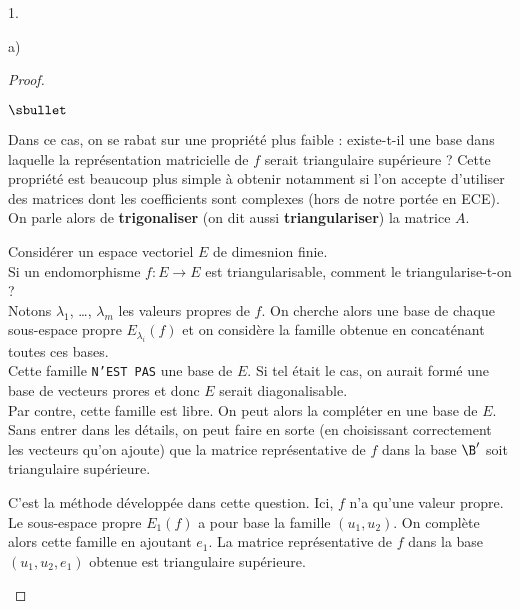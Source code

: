 \documentclass[11pt]{article}%
\begin{document}
\begin{noliste}{1.}
\begin{noliste}{a)}
\begin{proof}
\begin{remarkL}{.98}
\begin{noliste}{$\sbullet$}
      \item Dans ce cas, on se rabat sur une propriété plus faible :
        existe-t-il une base dans laquelle la représentation
        matricielle de $f$ serait triangulaire supérieure ? Cette
        propriété est beaucoup plus simple à obtenir notamment si l'on
        accepte d'utiliser des matrices dont les coefficients sont
        complexes (hors de notre portée en ECE).\\
        On parle alors de {\bf trigonaliser} (on dit aussi {\bf
          triangulariser}) la matrice $A$.

      \item Considérer un espace vectoriel $E$ de dimesnion finie. \\
        Si un endomorphisme $f : E \to E$ est triangularisable,
        comment le triangularise-t-on ? \\
        Notons $\lambda_1$, \ldots, $\lambda_m$ les valeurs propres de
        $f$. On cherche alors une base de chaque sous-espace propre
        $E_{\lambda_i}(f)$ et on considère la famille obtenue en
        concaténant toutes ces bases.\\
        Cette famille {\tt N'EST PAS} une base de $E$. Si tel était le
        cas, on aurait formé une base de vecteurs prores et donc $E$
        serait diagonalisable. \\
        Par contre, cette famille est libre. On peut alors la
        compléter en une base de $E$.\\
        Sans entrer dans les détails, on peut faire en sorte (en
        choisissant correctement les vecteurs qu'on ajoute) que la
        matrice représentative de $f$ dans la base $\B'$ soit
        triangulaire supérieure.

      \item C'est la méthode développée dans cette question. Ici, $f$
        n'a qu'une valeur propre. Le sous-espace propre $E_1(f)$ a
        pour base la famille $( u_1, u_2 )$. On complète alors cette
        famille en ajoutant $e_1$. La matrice représentative de $f$
        dans la base $( u_1, u_2, e_1 )$ obtenue est triangulaire
        supérieure.


\end{noliste}
\end{remarkL}
\end{proof}
\end{noliste}
\end{noliste}
\end{document}
